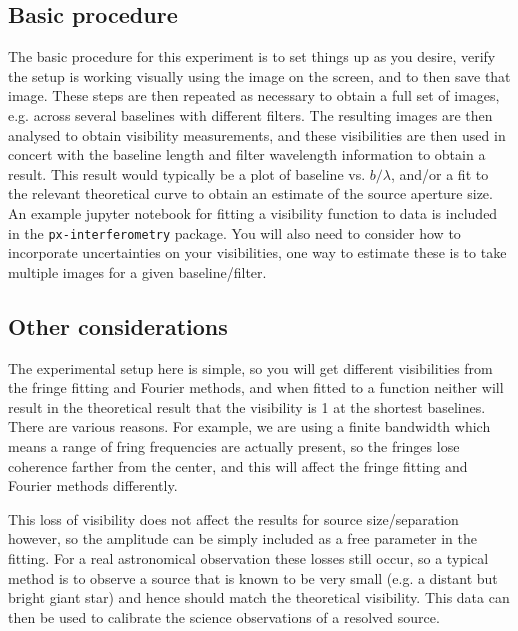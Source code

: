 \documentclass[11pt]{article}
\begin{document}
\subsection{Basic procedure}

The basic procedure for this experiment is to set things up as you desire, verify the setup is working visually using the image on the screen, and to then save that image. These steps are then repeated as necessary to obtain a full set of images, e.g. across several baselines with different filters. The resulting images are then analysed to obtain visibility measurements, and these visibilities are then used in concert with the baseline length and filter wavelength information to obtain a result. This result would typically be a plot of baseline vs. $b/\lambda$, and/or a fit to the relevant theoretical curve to obtain an estimate of the source aperture size. An example jupyter notebook for fitting a visibility function to data is included in the \texttt{px-interferometry} package. You will also need to consider how to incorporate uncertainties on your visibilities, one way to estimate these is to take multiple images for a given baseline/filter.

\subsection{Other considerations}

The experimental setup here is simple, so you will get different visibilities from the fringe fitting and Fourier methods, and when fitted to a function neither will result in the theoretical result that the visibility is 1 at the shortest baselines. There are various reasons. For example, we are using a finite bandwidth which means a range of fring frequencies are actually present, so the fringes lose coherence farther from the center, and this will affect the fringe fitting and Fourier methods differently.

This loss of visibility does not affect the results for source size/separation however, so the amplitude can be simply included as a free parameter in the fitting. For a real astronomical observation these losses still occur, so a typical method is to observe a source that is known to be very small (e.g. a distant but bright giant star) and hence should match the theoretical visibility. This data can then be used to calibrate the science observations of a resolved source.

\clearpage


\end{document}
